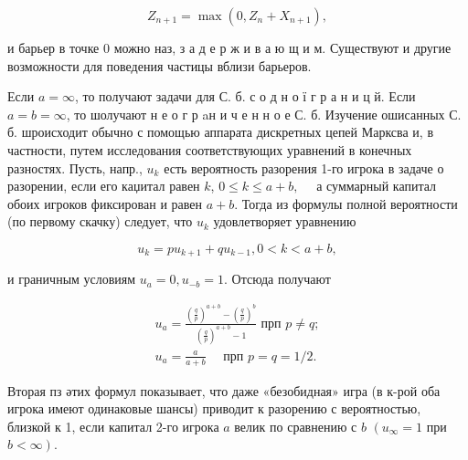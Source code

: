 \documentclass[10pt]{article}
\begin{document}
\[

Z_{n+1}=\max \left(0, Z_{n}+X_{n+1}\right),

\]



и барьер в точке 0 можно наз, з а д е р ж и в а ю щ и м. Существуют и другие возможности для поведения частицы вблизи барьеров.



Если $a=\infty$, то получают задачи для С. б. с о д н о ї г р а н и ц й. Если $a=b=\infty$, то шолучают н е о г р aн и ч е н н о е С. б. Изучение ошисанных С. б. шроисходит обычно с помощью аппарата дискретных цепей Марксва и, в частности, путем исследования соответствующих уравнений в конечных разностях. Пусть, напр., $u_{k}$ есть вероятность разорения 1-го игрока в задаче о разорении, если его каџитал равен $k$, $0 \leqslant k \leqslant a+b, \quad$ а суммарный капитал обоих игроков фиксирован и равен $a+b$. Тогда из формулы полной вероятности (по первому скачку) следует, что $u_{k}$ удовлетворяет уравнению



\[

u_{k}=p u_{k+1}+q u_{k-1}, 0<k<a+b,

\]



и граничным условиям $u_{a}=0, u_{-b}=1$. Отсюда получают



\[

\begin{gathered}

u_{a}=\frac{\left(\frac{q}{p}\right)^{a+b}-\left(\frac{q}{p}\right)^{b}}{\left(\frac{q}{p}\right)^{a+b}-1} \text { прп } p \neq q ; \\

u_{a}=\frac{a}{a+b} \quad \text { прп } p=q=1 / 2 .

\end{gathered}

\]



Вторая пз әтих формул показывает, что даже «безобидная» игра (в к-рой оба игрока имеют одинаковые шансы) приводит к разорению с вероятностью, близкой к 1, если капитал 2-го игрока $a$ велик по сравнению с $b$ $\left(u_{\infty}=1\right.$ при $\left.b<\infty\right)$.
\end{document}
